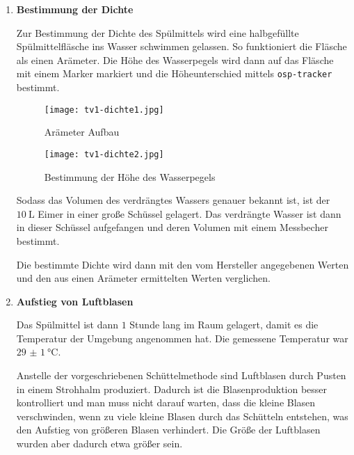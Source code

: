 		\begin{enumerate}
			\item \textbf{Bestimmung der Dichte}

				Zur Bestimmung der Dichte des Spülmittels wird eine halbgefüllte Spülmittelfläsche ins Wasser schwimmen gelassen. So funktioniert die Fläsche als einen Arämeter. Die Höhe des Wasserpegels wird dann auf das Fläsche mit einem Marker markiert und die Höheunterschied mittels \texttt{osp-tracker} bestimmt.
				\vspace{\baselineskip}
				\begin{multicols}{2}
					\begin{figure}[H]
						\centering
						\texttt{[image: tv1-dichte1.jpg]}
						\caption{\centering Arämeter Aufbau}
					\end{figure}
					\begin{figure}[H]
						\centering
						\texttt{[image: tv1-dichte2.jpg]}
						\caption{\centering Bestimmung der Höhe des Wasserpegels}
					\end{figure}
				\end{multicols}
				Sodass das Volumen des verdrängtes Wassers genauer bekannt ist, ist der $\SI{10}{\liter}$ Eimer in einer große Schüssel gelagert. Das verdrängte Wasser ist dann in dieser Schüssel aufgefangen und deren Volumen mit einem Messbecher bestimmt. 

				Die bestimmte Dichte wird dann mit den vom Hersteller angegebenen Werten und den aus einen Arämeter ermittelten Werten verglichen.
			\item \textbf{Aufstieg von Luftblasen}

				Das Spülmittel ist dann $1$ Stunde lang im Raum gelagert, damit es die Temperatur der Umgebung angenommen hat. Die gemessene Temperatur war $\SI{29(1)}{\celsius}$. 

				Anstelle der vorgeschriebenen Schüttelmethode sind Luftblasen durch Pusten in einem Strohhalm produziert. Dadurch ist die Blasenproduktion besser kontrolliert und man muss nicht darauf warten, dass die kleine Blasen verschwinden, wenn zu viele kleine Blasen durch das Schütteln entstehen, was den Aufstieg von größeren Blasen verhindert. Die Größe der Luftblasen wurden aber dadurch etwa größer sein.


\end{enumerate}
